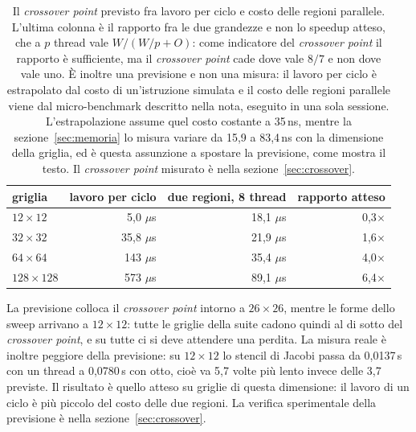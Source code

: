 \begin{table}[htbp]
    \centering
    \begin{tabular}{lrrr}
        \toprule
        griglia & lavoro per ciclo & due regioni, 8 thread & rapporto atteso \\
        \midrule
        $12\times12$   & 5,0 $\mu$s  & 18,1 $\mu$s & 0,3$\times$ \\
        $32\times32$   & 35,8 $\mu$s & 21,9 $\mu$s & 1,6$\times$ \\
        $64\times64$   & 143 $\mu$s  & 35,4 $\mu$s & 4,0$\times$ \\
        $128\times128$ & 573 $\mu$s  & 89,1 $\mu$s & 6,4$\times$ \\
        \bottomrule
    \end{tabular}
    \caption[Il \emph{crossover point} previsto]{Il \emph{crossover point} previsto fra lavoro per ciclo e
             costo delle regioni parallele. L'ultima colonna è il rapporto fra
             le due grandezze e non lo speedup atteso, che a $p$ thread vale
             $W/(W/p + O)$: come indicatore del \emph{crossover point} il rapporto è
             sufficiente, ma il \emph{crossover point} cade dove vale $8/7$ e non dove vale
             uno. È inoltre una previsione e non una
             misura: il lavoro per ciclo è estrapolato dal costo di un'istruzione
              simulata e il costo delle regioni parallele viene dal
             micro-benchmark descritto nella nota, eseguito in una sola
             sessione. L'estrapolazione assume
             quel costo costante a 35\,ns, mentre la
             sezione~\ref{sec:memoria} lo misura variare da 15,9 a 83,4\,ns con
             la dimensione della griglia, ed è questa assunzione a spostare la
             previsione, come mostra il testo. Il \emph{crossover point} misurato è nella
             sezione~\ref{sec:crossover}.}
    \label{tab:crossover}
\end{table}

La previsione colloca il \emph{crossover point} intorno a $26\times26$, mentre le forme dello
sweep arrivano a $12\times12$: tutte le griglie della suite cadono quindi al di
sotto del \emph{crossover point}, e su tutte ci si deve attendere una perdita. La misura
reale è inoltre peggiore della previsione: su
$12\times12$ lo stencil di Jacobi passa da 0,0137\,s con un thread a 0,0780\,s
con otto, cioè va 5,7 volte più lento invece delle 3,7 previste. Il risultato è quello
atteso su griglie di questa dimensione: il lavoro di un ciclo è più piccolo del
costo delle due regioni. La verifica sperimentale della previsione è nella
sezione~\ref{sec:crossover}.

